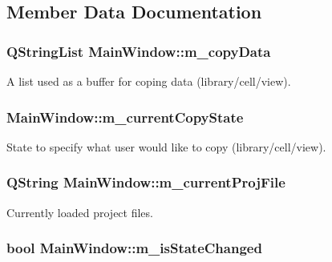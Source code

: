 \subsection{Member Data Documentation}
\hypertarget{classMainWindow_a306adca5f257e5aeaa50ff06605a7a86}{
\subsubsection[{m\-\_\-copy\-Data}]{\setlength{\rightskip}{0pt plus 5cm}Q\-String\-List Main\-Window\-::m\-\_\-copy\-Data\hspace{0.3cm}{\ttfamily [private]}}}\label{classMainWindow_a306adca5f257e5aeaa50ff06605a7a86}
A list used as a buffer for coping data (library/cell/view). \hypertarget{classMainWindow_a77153a35340c4a8a40f8528301bd96ad}{
\subsubsection[{m\-\_\-current\-Copy\-State}]{ Main\-Window\-::m\-\_\-current\-Copy\-State\hspace{0.3cm}{\ttfamily [private]}}}\label{classMainWindow_a77153a35340c4a8a40f8528301bd96ad}
State to specify what user would like to copy (library/cell/view). \hypertarget{classMainWindow_ade3f7ebe5eb1bf67444cd41b2bc38aca}{
\subsubsection[{m\-\_\-current\-Proj\-File}]{\setlength{\rightskip}{0pt plus 5cm}Q\-String Main\-Window\-::m\-\_\-current\-Proj\-File\hspace{0.3cm}{\ttfamily [private]}}}\label{classMainWindow_ade3f7ebe5eb1bf67444cd41b2bc38aca}
Currently loaded project files. \hypertarget{classMainWindow_a3c61f9d7deec39afb315e57ef159ba18}{
\subsubsection[{m\-\_\-is\-State\-Changed}]{\setlength{\rightskip}{0pt plus 5cm}bool Main\-Window\-::m\-\_\-is\-State\-Changed\hspace{0.3cm}{\ttfamily [private]}}}\label{classMainWindow_a3c61f9d7deec39afb315e57ef159ba18}
